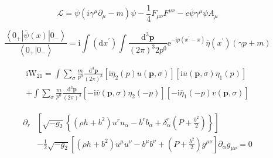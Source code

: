 \documentclass[11pt,a4paper]{book}
\begin{document}
\begin{equation}
    \mathcal { L } = \overline { \psi } \left( i \gamma ^ { \mu } \partial _ { \mu } - m \right) \psi - \frac { 1 } { 4 } F _ { \mu \nu } F ^ { \mu \nu } - e \overline { \psi } \gamma ^ { \mu } \psi A _ { \mu }
\end{equation}


\begin{equation}
    \frac { \left\langle 0 _ { + } | \overline { \psi } ( x ) | 0 _ { - } \right\rangle } { \left\langle 0 _ { + } | 0 _ { - } \right\rangle } = \mathrm { i } \int \left( \mathrm { d } x ^ { \prime } \right) \int \frac { \mathrm { d } ^ { 3 } \mathbf { p } } { ( 2 \pi ) ^ { 3 } 2 p ^ { 0 } } \mathrm { e } ^ { - \mathrm { i } p \left( x ^ { \prime } - x \right) } \overline { \eta } \left( x ^ { \prime } \right) ( \gamma p + m )
\end{equation}

\begin{equation}
    \left. \begin{array} { l } { \mathrm { i } \mathrm { W } _ { 21 } = \int \sum _ { \sigma } \frac { m } { p ^ { 0 } } \frac { \mathrm { d } ^ { 3 } \mathbf { p } } { ( 2 \pi ) ^ { 3 } } \left[ \mathrm { i } \overline { \eta } _ { 2 } ( p ) u ( \mathbf { p } , \sigma ) \right] \left[ \mathrm { i } \overline { u } ( \mathbf { p } , \sigma ) \eta _ { 1 } ( p ) \right] } \\ { + \int \sum _ { \sigma } \frac { m } { p ^ { 0 } } \frac { \mathrm { d } ^ { 3 } \mathbf { p } } { ( 2 \pi ) ^ { 3 } } \left[ - \mathrm { i } \overline { v } ( \mathbf { p } , \sigma ) \eta _ { 2 } ( - p ) \right] \left[ - \mathrm { i } \overline { \eta } _ { 1 } ( - p ) v ( \mathbf { p } , \sigma ) \right] } \end{array} \right.
\end{equation}

\begin{equation}
    \left.\begin{aligned} \partial _ { r } & \left[ \sqrt { - g _ { 2 } } \left\{ \left( \rho h + b ^ { 2 } \right) u ^ { r } u _ { \alpha } - b ^ { r } b _ { \alpha } + \delta _ { \alpha } ^ { r } \left( P + \frac { b ^ { 2 } } { 2 } \right) \right\} \right] \\& - \frac { 1 } { 2 } \sqrt { - g _ { 2 } } \left[ \left( \rho h + b ^ { 2 } \right) u ^ { \mu } u ^ { \nu } - b ^ { \mu } b ^ { \nu } + \left( P + \frac { b ^ { 2 } } { 2 } \right) g ^ { \mu \nu } \right] \partial _ { \alpha } g _ { \mu \nu } = 0 \end{aligned} \right.
\end{equation}
\end{document}
